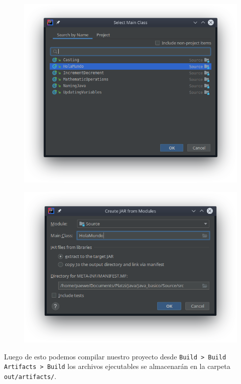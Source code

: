 \documentclass{article}
\begin{document}
\begin{figure}[h!]
  \centering
  \includegraphics[scale=0.60]{./Pictures/008_jar.png}
\end{figure}

\newpage

\begin{figure}[h!]
  \centering
  \includegraphics[scale=0.60]{./Pictures/009.png}
\end{figure}

Luego de esto podemos compilar nuestro proyecto desde \texttt{Build > Build
Artifacts > Build} los archivos ejecutables se almacenarán en la carpeta
\texttt{out/artifacts/}.
\end{document}

